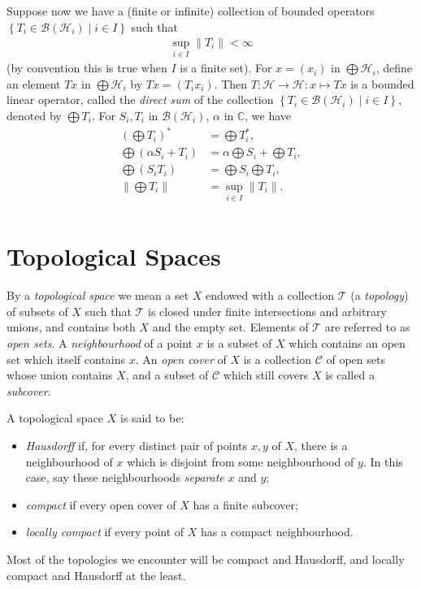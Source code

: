 \documentclass[11pt,a4paper]{report}
\theoremstyle{plain}
\theoremstyle{definition}
\newcommand{\1}{\mathbbm{1}}
\newcommand{\C}{\mathbb{C}}
\renewcommand{\H}{\mathcal{H}}
\newcommand{\B}{\mathcal{B}}
\newcommand{\T}{\mathcal{T}}
\newcommand{\cover}{\mathcal{C}}
\renewcommand{\oplus}{\textstyle\bigoplus}
\begin{document}
Suppose now we have a (finite or infinite) collection of bounded operators 
$\left\{T_i\in \B{(\H_i)} \mid i\in I\right\}$ such that
\begin{align*}
	\sup_{i\in I} {\left\|T_i\right\|} < \infty
\end{align*} 
(by convention this is true when $I$ is a finite set).
For $x=(x_i)$ in $\oplus\H_i$, define an element $Tx$ in $\oplus\H_i$ by 
$Tx=(T_ix_i)$. Then $T:\H\to\H:x\mapsto Tx$ is a bounded linear operator, called 
the \emph{direct sum} of the collection $\left\{T_i\in\B{(\H_i)} \mid i \in 
I\right\}$, denoted by $\oplus T_i$. For $S_i,T_i$ in $\B(\H_i)$, $\alpha$ in 
$\C$, we have 
\begin{align*}
		\left(\oplus T_i\right)^\ast &= \oplus T_i^\ast,										\\
		\oplus (\alpha S_i+ T_i) &= 
					\alpha \oplus S_i + \oplus T_i, 											\\
		\oplus (S_i T_i) &= \oplus S_i \oplus T_i,												\\
		\left\|\oplus T_i\right\| &= \sup_{i\in I} {\left\|T_i\right\|}.						\\
\end{align*}

\section{Topological Spaces}\label{section:topology}
By a \emph{topological space} we mean a set $X$ endowed with a collection $\T$ 
(a \emph{topology}) of subsets of $X$ such that $\T$ is closed under finite 
intersections and arbitrary unions, and contains both $X$ and the empty set. 
Elements of $\T$ are referred to as \emph{open sets}.
A \emph{neighbourhood} of a point $x$ is a subset of $X$ which contains an open 
set which itself contains $x$. An \emph{open cover} of $X$ is a collection 
$\cover$ of open sets whose union contains $X$, and a subset of $\cover$ which 
still covers $X$ is called a \emph{subcover}. 

A topological space $X$ is said to be:
\begin{itemize}
	\item \emph{Hausdorff} if, for every distinct pair of points $x,y$ of $X$, 
	there is a neighbourhood of $x$ which is disjoint from some neighbourhood of 
	$y$. In this case, say these neighbourhoods \emph{separate} $x$ and $y$;
	\item \emph{compact} if every open cover of $X$ has a finite subcover;
	\item \emph{locally compact} if every point of $X$ has a compact neighbourhood.
\end{itemize}
Most of the topologies we encounter will be compact and Hausdorff, and locally compact 
and Hausdorff at the least.
\end{document}

